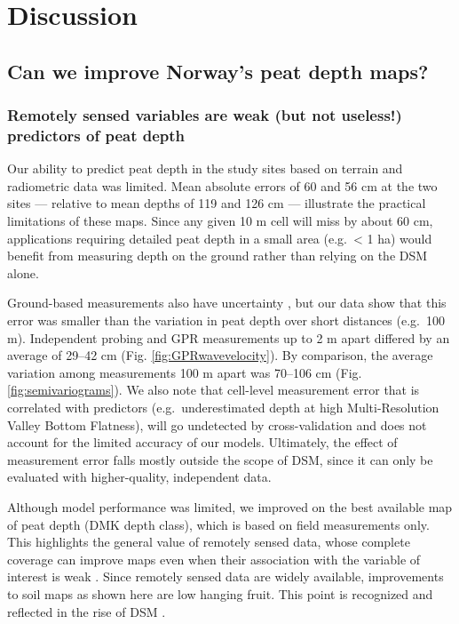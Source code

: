 \documentclass[soil, manuscript]{copernicus}
\begin{document}
\section{Discussion}

\subsection{Can we improve Norway's peat depth maps?}

\subsubsection{Remotely sensed variables are weak (but not useless!) predictors of peat depth}

Our ability to predict peat depth in the study sites based on terrain and radiometric data was limited.
Mean absolute errors of 60 and 56 cm at the two sites --- relative to mean depths of 119 and 126 cm --- illustrate the practical limitations of these maps.
Since any given 10 m cell will miss by about 60 cm, applications requiring detailed peat depth in a small area (e.g.~\textless{} 1 ha) would benefit from measuring depth on the ground rather than relying on the DSM alone.

Ground-based measurements also have uncertainty \citep{parryEvaluatingApproachesEstimating2014}, but our data show that this error was smaller than the variation in peat depth over short distances (e.g.~100 m).
Independent probing and GPR measurements up to 2 m apart differed by an average of 29--42 cm (Fig. \ref{fig:GPRwavevelocity}).
By comparison, the average variation among measurements 100 m apart was 70--106 cm (Fig. \ref{fig:semivariograms}).
We also note that cell-level measurement error that is correlated with predictors (e.g.~underestimated depth at high Multi-Resolution Valley Bottom Flatness), will go undetected by cross-validation and does not account for the limited accuracy of our models.
Ultimately, the effect of measurement error falls mostly outside the scope of DSM, since it can only be evaluated with higher-quality, independent data.

Although model performance was limited, we improved on the best available map of peat depth (DMK depth class), which is based on field measurements only.
This highlights the general value of remotely sensed data, whose complete coverage can improve maps even when their association with the variable of interest is weak \citep{mulderUseRemoteSensing2011}.
Since remotely sensed data are widely available, improvements to soil maps as shown here are low hanging fruit.
This point is recognized and reflected in the rise of DSM \citep{minasnyDigitalMappingPeatlands2019}.
\end{document}
